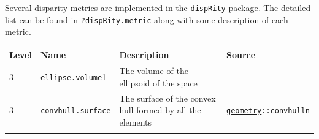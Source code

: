 \documentclass[]{book}
\theoremstyle{definition}
\theoremstyle{definition}
\theoremstyle{remark}
\begin{document}
Several disparity metrics are implemented in the \texttt{dispRity}
package. The detailed list can be found in \texttt{?dispRity.metric}
along with some description of each metric.

\begin{longtable}[]{@{}llll@{}}
\toprule
\begin{minipage}[b]{0.08\columnwidth}\raggedright\strut
Level\strut
\end{minipage} & \begin{minipage}[b]{0.08\columnwidth}\raggedright\strut
Name\strut
\end{minipage} & \begin{minipage}[b]{0.61\columnwidth}\raggedright\strut
Description\strut
\end{minipage} & \begin{minipage}[b]{0.11\columnwidth}\raggedright\strut
Source\strut
\end{minipage}\tabularnewline
\midrule
\endhead
\begin{minipage}[t]{0.08\columnwidth}\raggedright\strut
3\strut
\end{minipage} & \begin{minipage}[t]{0.08\columnwidth}\raggedright\strut
\texttt{ellipse.volume}1\strut
\end{minipage} & \begin{minipage}[t]{0.61\columnwidth}\raggedright\strut
The volume of the ellipsoid of the space\strut
\end{minipage} & \begin{minipage}[t]{0.11\columnwidth}\raggedright\strut
\citep{DonohueDim}\strut
\end{minipage}\tabularnewline
\begin{minipage}[t]{0.08\columnwidth}\raggedright\strut
3\strut
\end{minipage} & \begin{minipage}[t]{0.08\columnwidth}\raggedright\strut
\texttt{convhull.surface}\strut
\end{minipage} & \begin{minipage}[t]{0.61\columnwidth}\raggedright\strut
The surface of the convex hull formed by all the elements\strut
\end{minipage} & \begin{minipage}[t]{0.11\columnwidth}\raggedright\strut
\href{https://cran.r-project.org/web/packages/geometry/index.html}{\texttt{geometry}}\texttt{::convhulln}\strut
\end{minipage}\tabularnewline
\begin{minipage}[t]{0.08\columnwidth}\raggedright\strut

\end{minipage}
\end{longtable}
\end{document}
